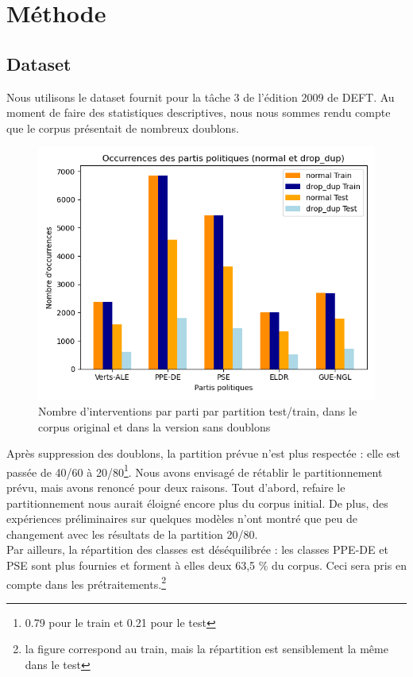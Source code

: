 \section{Méthode}

\subsection{Dataset}

Nous utilisons le dataset fournit pour la tâche 3 de l’édition 2009 de DEFT.
Au moment de faire des statistiques descriptives, nous nous sommes rendu compte 
que le corpus présentait de nombreux doublons.
\begin{figure}[ht]
    \centering
    \includegraphics[width=\columnwidth]{../stats/occurences_orig_vs_drop_dup_par_cat.png}
    \caption{Nombre d'interventions par parti par partition test/train, dans le corpus original et dans la version sans doublons}
    \label{fig:barplot_dataset}
\end{figure}

Après suppression des doublons, la partition prévue n'est plus respectée : elle est 
passée de 40/60 à 20/80\footnote{ 0.79 pour le train et 0.21 pour le test}.
Nous avons envisagé de rétablir le partitionnement prévu, mais avons renoncé pour deux raisons. Tout d'abord,  
refaire le partitionnement nous aurait éloigné encore plus du corpus initial. De plus, des expériences préliminaires sur quelques modèles
n'ont montré que peu de changement avec les résultats de la partition 20/80.\\
Par ailleurs, la répartition des classes est déséquilibrée : les classes PPE-DE et PSE sont plus fournies et forment à elles deux 63,5 \% du corpus. Ceci sera
pris en compte dans les prétraitements.\footnote{la figure correspond au train, mais la répartition est sensiblement la même dans le test}

